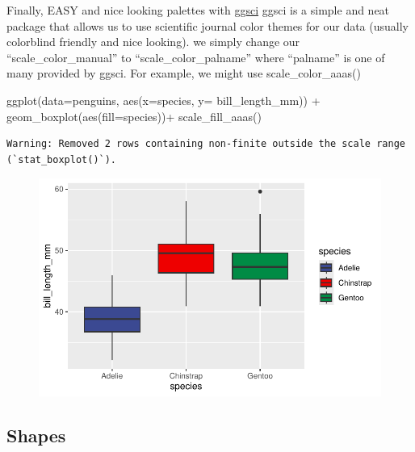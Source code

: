 \documentclass[
  letterpaper,
  DIV=11,
  numbers=noendperiod]{scrartcl}
\newenvironment{Shaded}{\begin{snugshade}}{\end{snugshade}}
\newcommand{\AttributeTok}[1]{\textcolor[rgb]{0.40,0.45,0.13}{#1}}
\newcommand{\FunctionTok}[1]{\textcolor[rgb]{0.28,0.35,0.67}{#1}}
\newcommand{\NormalTok}[1]{\textcolor[rgb]{0.00,0.23,0.31}{#1}}
\newcommand{\SpecialCharTok}[1]{\textcolor[rgb]{0.37,0.37,0.37}{#1}}
\begin{document}
Finally, EASY and nice looking palettes with
\href{https://cran.r-project.org/web/packages/ggsci/vignettes/ggsci.html}{ggsci}
ggsci is a simple and neat package that allows us to use scientific
journal color themes for our data (usually colorblind friendly and nice
looking). we simply change our ``scale\_color\_manual'' to
``scale\_color\_palname'' where ``palname'' is one of many provided by
ggsci. For example, we might use scale\_color\_aaas()

\begin{Shaded}
\begin{Highlighting}[]
\FunctionTok{ggplot}\NormalTok{(}\AttributeTok{data=}\NormalTok{penguins, }\FunctionTok{aes}\NormalTok{(}\AttributeTok{x=}\NormalTok{species, }\AttributeTok{y=}\NormalTok{ bill\_length\_mm)) }\SpecialCharTok{+}
  \FunctionTok{geom\_boxplot}\NormalTok{(}\FunctionTok{aes}\NormalTok{(}\AttributeTok{fill=}\NormalTok{species))}\SpecialCharTok{+}
  \FunctionTok{scale\_fill\_aaas}\NormalTok{()}
\end{Highlighting}
\end{Shaded}

\begin{verbatim}
Warning: Removed 2 rows containing non-finite outside the scale range
(`stat_boxplot()`).
\end{verbatim}

\begin{figure}[H]

{\centering \includegraphics{Lab_2_files/figure-pdf/unnamed-chunk-27-1.pdf}

}

\end{figure}

\subsection{\texorpdfstring{\textbf{Shapes}}{Shapes}}
\end{document}
